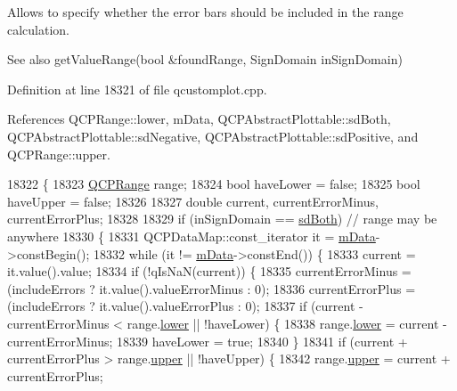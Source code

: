 Allows to specify whether the error bars should be included in the range calculation.

\begin{DoxySeeAlso}{See also}
get\+Value\+Range(bool \&found\+Range, Sign\+Domain in\+Sign\+Domain) 
\end{DoxySeeAlso}


Definition at line 18321 of file qcustomplot.\+cpp.



References Q\+C\+P\+Range\+::lower, m\+Data, Q\+C\+P\+Abstract\+Plottable\+::sd\+Both, Q\+C\+P\+Abstract\+Plottable\+::sd\+Negative, Q\+C\+P\+Abstract\+Plottable\+::sd\+Positive, and Q\+C\+P\+Range\+::upper.


\begin{DoxyCode}
18322                                                            \{
18323   \hyperlink{class_q_c_p_range}{QCPRange} range;
18324   \textcolor{keywordtype}{bool} haveLower = \textcolor{keyword}{false};
18325   \textcolor{keywordtype}{bool} haveUpper = \textcolor{keyword}{false};
18326 
18327   \textcolor{keywordtype}{double} current, currentErrorMinus, currentErrorPlus;
18328 
18329   \textcolor{keywordflow}{if} (inSignDomain == \hyperlink{class_q_c_p_abstract_plottable_a661743478a1d3c09d28ec2711d7653d8a082b98cfb91a7363a3b5cd17b0c1cd60}{sdBoth}) \textcolor{comment}{// range may be anywhere}
18330   \{
18331     QCPDataMap::const\_iterator it = \hyperlink{class_q_c_p_graph_a8457c840f69a0ac49f61d30a509c5d08}{mData}->constBegin();
18332     \textcolor{keywordflow}{while} (it != \hyperlink{class_q_c_p_graph_a8457c840f69a0ac49f61d30a509c5d08}{mData}->constEnd()) \{
18333       current = it.value().value;
18334       \textcolor{keywordflow}{if} (!qIsNaN(current)) \{
18335         currentErrorMinus = (includeErrors ? it.value().valueErrorMinus : 0);
18336         currentErrorPlus = (includeErrors ? it.value().valueErrorPlus : 0);
18337         \textcolor{keywordflow}{if} (current - currentErrorMinus < range.\hyperlink{class_q_c_p_range_aa3aca3edb14f7ca0c85d912647b91745}{lower} || !haveLower) \{
18338           range.\hyperlink{class_q_c_p_range_aa3aca3edb14f7ca0c85d912647b91745}{lower} = current - currentErrorMinus;
18339           haveLower = \textcolor{keyword}{true};
18340         \}
18341         \textcolor{keywordflow}{if} (current + currentErrorPlus > range.\hyperlink{class_q_c_p_range_ae44eb3aafe1d0e2ed34b499b6d2e074f}{upper} || !haveUpper) \{
18342           range.\hyperlink{class_q_c_p_range_ae44eb3aafe1d0e2ed34b499b6d2e074f}{upper} = current + currentErrorPlus;

\end{DoxyCode}
